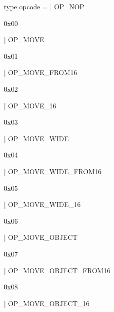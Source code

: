 \documentclass[11pt]{article}
\begin{document}
\label{type:Instr.opcode}\begin{ocamldoccode}
type opcode =
  | OP_NOP
\end{ocamldoccode}
\begin{ocamldoccomment}
0x00
\end{ocamldoccomment}
\begin{ocamldoccode}
  | OP_MOVE
\end{ocamldoccode}
\begin{ocamldoccomment}
0x01
\end{ocamldoccomment}
\begin{ocamldoccode}
  | OP_MOVE_FROM16
\end{ocamldoccode}
\begin{ocamldoccomment}
0x02
\end{ocamldoccomment}
\begin{ocamldoccode}
  | OP_MOVE_16
\end{ocamldoccode}
\begin{ocamldoccomment}
0x03
\end{ocamldoccomment}
\begin{ocamldoccode}
  | OP_MOVE_WIDE
\end{ocamldoccode}
\begin{ocamldoccomment}
0x04
\end{ocamldoccomment}
\begin{ocamldoccode}
  | OP_MOVE_WIDE_FROM16
\end{ocamldoccode}
\begin{ocamldoccomment}
0x05
\end{ocamldoccomment}
\begin{ocamldoccode}
  | OP_MOVE_WIDE_16
\end{ocamldoccode}
\begin{ocamldoccomment}
0x06
\end{ocamldoccomment}
\begin{ocamldoccode}
  | OP_MOVE_OBJECT
\end{ocamldoccode}
\begin{ocamldoccomment}
0x07
\end{ocamldoccomment}
\begin{ocamldoccode}
  | OP_MOVE_OBJECT_FROM16
\end{ocamldoccode}
\begin{ocamldoccomment}
0x08
\end{ocamldoccomment}
\begin{ocamldoccode}
  | OP_MOVE_OBJECT_16
\end{ocamldoccode}
\end{document}
